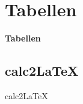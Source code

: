 \section{Tabellen}
\begin{frame}[c]
	\begin{center}
		\LARGE \textbf{Tabellen}
	\end{center}
\end{frame}
\subsection{calc2LaTeX}
\begin{frame}[c]
	\begin{center}
		\large calc2LaTeX
	\end{center}
\end{frame}
